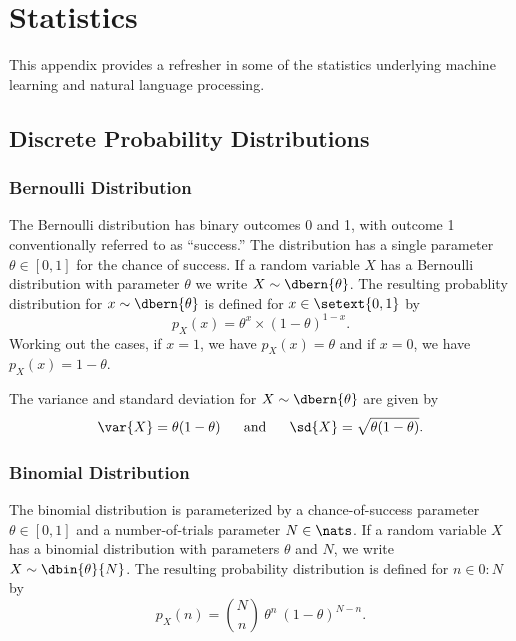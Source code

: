 \chapter{Statistics}\label{appendix:stats}

This appendix provides a refresher in some of the statistics
underlying machine learning and natural language processing.




\section{Discrete Probability Distributions}

\subsection{Bernoulli Distribution}\label{section:stats-bernoulli-distro}

The Bernoulli distribution has binary outcomes 0 and 1, with outcome 1
conventionally referred to as ``success.''  The distribution has a
single parameter $\theta \in [0,1]$ for the chance of success.  If a
random variable $X$ has a Bernoulli distribution with parameter
$\theta$ we write $X \sim \dbern{\theta}$.  The resulting probablity
distribution for $x \sim \dbern{\theta}$ is defined for $x \in
\setext{0,1}$ by
%
\begin{equation}
p_X(x) = \theta^{x} \times (1 - \theta)^{1-x}.
\end{equation}
%
Working out the cases, if $x=1$, we have $p_X(x) = \theta$ and
if $x=0$, we have $p_X(x) = 1 - \theta$.

The variance and standard deviation for $X \sim \dbern{\theta}$ are
given by
%
\begin{equation}
\var{X} = \theta (1-\theta)
\ \ \ \ \ \mbox{and} \ \ \ \ \
\sd{X} = \sqrt{\theta (1 - \theta)}.
\end{equation}


\subsection{Binomial Distribution}\label{section:stats-binomial-distribution}

The binomial distribution is parameterized by a chance-of-success
parameter $\theta \in [0,1]$ and a number-of-trials parameter $N \in
\nats$.  If a random variable $X$ has a binomial distribution with
parameters $\theta$ and $N$, we write $X \sim \dbin{\theta}{N}$.  The
resulting probability distribution is defined for $n \in 0{:}N$ by
%
\begin{equation}
p_X(n) = {N \choose n} \ \theta^{n} \ (1-\theta)^{N-n}.
\end{equation}
%
%

